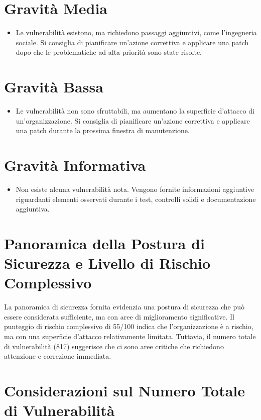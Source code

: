 \section{Gravità Media}
\begin{itemize}
\item Le vulnerabilità esistono, ma richiedono passaggi aggiuntivi, come l'ingegneria sociale. Si consiglia di pianificare un'azione correttiva e applicare una patch dopo che le problematiche ad alta priorità sono state risolte.
\end{itemize}
\section{Gravità Bassa}
\begin{itemize}
\item Le vulnerabilità non sono sfruttabili, ma aumentano la superficie d'attacco di un'organizzazione. Si consiglia di pianificare un'azione correttiva e applicare una patch durante la prossima finestra di manutenzione.
\end{itemize}
\section{Gravità Informativa}
\begin{itemize}
\item Non esiste alcuna vulnerabilità nota. Vengono fornite informazioni aggiuntive riguardanti elementi osservati durante i test, controlli solidi e documentazione aggiuntiva.
\end{itemize}

\section{Panoramica della Postura di Sicurezza e Livello di Rischio Complessivo}

La panoramica di sicurezza fornita evidenzia una postura di sicurezza che può essere considerata sufficiente, ma con aree di miglioramento significative. Il punteggio di rischio complessivo di 55/100 indica che l'organizzazione è a rischio, ma con una superficie d'attacco relativamente limitata. Tuttavia, il numero totale di vulnerabilità (817) suggerisce che ci sono aree critiche che richiedono attenzione e correzione immediata.

\section{Considerazioni sul Numero Totale di Vulnerabilità}


